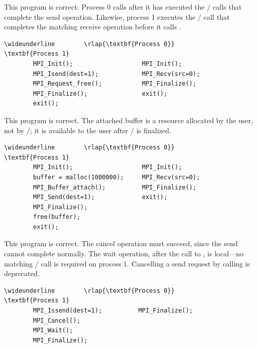 \begin{example}
%
  This program is correct:  Process 0 calls
     after it has executed
    the \MPI/ calls that complete the
    send operation. Likewise, process 1 executes the \MPI/ call
    that completes the matching receive operation before it calls .
\begin{Verbatim}[commandchars=\\\{\}]
\wideunderline        \rlap{\textbf{Process 0}}                              \textbf{Process 1}
        MPI_Init();                   MPI_Init();
        MPI_Isend(dest=1);            MPI_Recv(src=0);
        MPI_Request_free();           MPI_Finalize();
        MPI_Finalize();               exit();
        exit();
\end{Verbatim}
\lstset{fancyvrb=false}
\end{example}

\begin{example}
%
  This program is correct.  The attached buffer is a resource
    allocated by the user, not by \MPI/; it is available to the user
    after \MPI/ is finalized.
\begin{Verbatim}[commandchars=\\\{\}]
\wideunderline        \rlap{\textbf{Process 0}}                              \textbf{Process 1}
        MPI_Init();                   MPI_Init();
        buffer = malloc(1000000);     MPI_Recv(src=0);
        MPI_Buffer_attach();          MPI_Finalize();
        MPI_Send(dest=1);             exit();
        MPI_Finalize();
        free(buffer);
        exit();
\end{Verbatim}
\lstset{fancyvrb=false}
\end{example}

\begin{example}
%
  This program is correct.  The cancel operation must succeed,
    since the send cannot complete normally. The wait operation, after
    the call to , is
    local---no matching \MPI/ call is required on process 1.
    Cancelling a send request by calling  is deprecated.

\begin{Verbatim}[commandchars=\\\{\}]
\wideunderline        \rlap{\textbf{Process 0}}                             \textbf{Process 1}
        MPI_Issend(dest=1);          MPI_Finalize();
        MPI_Cancel();
        MPI_Wait();
        MPI_Finalize();
\end{Verbatim}
\lstset{fancyvrb=false}
\end{example}

